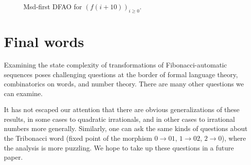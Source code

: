 \documentclass[12pt,runningheads]{llncs}
\newcommand{\tO}{\mathtt{0}}
\newcommand{\tL}{\mathtt{1}}
\begin{document}
\begin{example}
\begin{figure}[!ht]
{
}
\caption{Msd-first DFAO for $(f(i+10))_{i \geq 0}$.}
\label{fig:msd-automaton-c=10}
\end{figure}
\end{example}



\section{Final words}

Examining the state complexity of transformations of Fibonacci-automatic sequences poses challenging questions at the border of formal language theory, combinatorics on words, and number theory.  There are many other questions we can examine.

It has not escaped our attention that there are obvious generalizations of these results, in some cases to quadratic irrationals, and in other cases to irrational numbers more generally.  Similarly, one can ask the same kinds of questions about the Tribonacci word (fixed point of the morphism $0 \rightarrow 01$, $1 \rightarrow 02$, $2 \rightarrow 0$), where the analysis is more puzzling.  We hope to take up these questions in a future paper.
\end{document}
